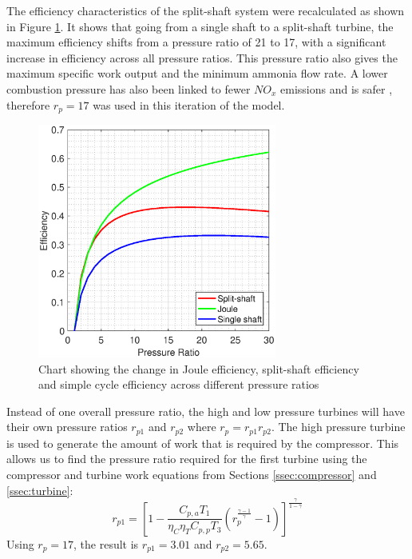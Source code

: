 The efficiency characteristics of the split-shaft system were recalculated as shown in Figure \ref{fig:twinefficiency}. It shows that going from a single shaft to a split-shaft turbine, the maximum efficiency shifts from a pressure ratio of 21 to 17, with a significant increase in efficiency across all pressure ratios. This pressure ratio also gives the maximum specific work output and the minimum ammonia flow rate. A lower combustion pressure has also been linked to fewer $NO_x$ emissions and is safer \cite{junLi}, therefore $r_p=17$ was used in this iteration of the model. 
\begin{figure} [h]
\centering
\includegraphics[width=0.7\textwidth]{./pictures/efficiencyPT.eps}
  \caption{Chart showing the change in Joule efficiency, split-shaft efficiency and simple cycle efficiency across different pressure ratios} \label{fig:twinefficiency}
  \end{figure}
  
Instead of one overall pressure ratio, the high and low pressure turbines will have their own pressure ratios $r_{p1}$ and $r_{p2}$ where $r_p = r_{p1} r_{p2}$. The high pressure turbine is used to generate the amount of work that is required by the compressor. This allows us to find the pressure ratio required for the first turbine using the compressor and turbine work equations from Sections \ref{ssec:compressor} and \ref{ssec:turbine}:
\begin{equation}
r_{p1} = \left[1-\frac{C_{p, a} T_1}{\eta_C \eta_T C_{p, p} T_3} \left(r_p^\frac{\gamma -1}{\gamma}-1\right)\right]^{\frac{\gamma}{1-\gamma}}
\end{equation} %
Using $r_p=17$, the result is $r_{p1}=3.01$ and $r_{p2}=5.65$.

